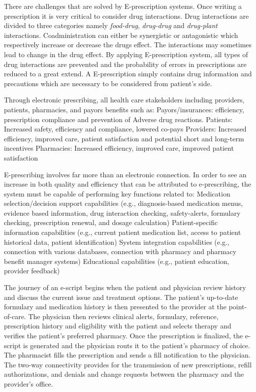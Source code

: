 \documentclass[10pt, conference, compsocconf]{IEEEtran}
\begin{document}
There are challenges that are solved by E-prescription systems.
Once writing a prescription it is very critical to consider drug interactions.
Drug interactions are divided to three categories namely \emph{food-drug}, \emph{drug-drug} and \emph{drug-plant} interactions.
Coadministration can either be synergistic or antagonistic which respectively increase or decrease the drugs effect.
The interactions may sometimes lead to change in the drug effect.
By applying E-prescription system, all types of drug interactions are prevented and the probability of errors in prescriptions are reduced to a great extend.
A E-prescription simply contains drug information and precautions which are necessary to be considered from patient's side.

Through electronic prescribing, all health care stakeholders including providers, patients, pharmacies, and payors benefits such as:
Payors/insurances: efficiency, prescription compliance and prevention of Adverse drug reactions.
Patients: Increased safety, efficiency and compliance, lowered co-pays
Providers: Increased efficiency, improved care, patient satisfaction and potential short and long-term incentives
Pharmacies: Increased efficiency, improved care, improved patient satisfaction

E-prescribing involves far more than an electronic connection. In order to see an increase in both quality and efficiency that can be attributed to e-prescribing, the system must be capable of performing key functions related to:
Medication selection/decision support capabilities (e.g., diagnosis-based medication menus, evidence based information, drug interaction checking, safety-alerts, formulary checking, prescription renewal, and dosage calculation)
Patient-specific information capabilities (e.g., current patient medication list, access to patient historical data, patient identification)
System integration capabilities (e.g., connection with various databases, connection with pharmacy and pharmacy benefit manager systems)
Educational capabilities (e.g., patient education, provider feedback)

The journey of an e-script begins when the patient and physician review history and discuss the current issue and treatment options. The patient’s up-to-date formulary and medication history is then presented to the provider at the point-of-care.
The physician then reviews clinical alerts, formulary, reference, prescription history and eligibility with the patient and selects therapy and verifies the patient’s preferred pharmacy.
Once the prescription is finalized, the e-script is generated and the physician routs it to the patient’s pharmacy of choice. The pharmacist fills the prescription and sends a fill notification to the physician.
The two-way connectivity provides for the transmission of new prescriptions, refill authorizations, and denials and change requests between the pharmacy and the provider’s office.
\end{document}
